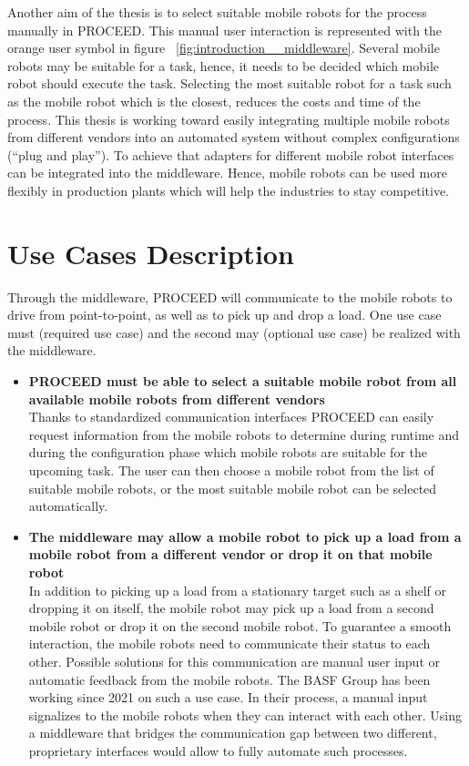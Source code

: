 \newpage
Another aim of the thesis is to select suitable mobile robots for the process manually in PROCEED. This manual user interaction is represented with the orange user symbol in figure ~\ref{fig:introduction__middleware}. Several mobile robots may be suitable for a task, hence, it needs to be decided which mobile robot should execute the task. Selecting the most suitable robot for a task such as the mobile robot which is the closest, reduces the costs and time of the process. This thesis is working toward easily integrating multiple mobile robots from different vendors into an automated system without complex configurations (“plug and play”). To achieve that adapters for different mobile robot interfaces can be integrated into the middleware. Hence, mobile robots can be used more flexibly in production plants which will help the industries to stay competitive.

\section{Use Cases Description}
Through the middleware, PROCEED will communicate to the mobile robots to drive from point-to-point, as well as to pick up and drop a load. One use case must (required use case) and the second may (optional use case) be realized with the middleware.
 \begin{itemize}
   \item \textbf{ PROCEED must be able to select a suitable mobile robot from all available mobile robots from different vendors} \hfill \\
Thanks to standardized communication interfaces PROCEED can easily request information from the mobile robots to determine during runtime and during the configuration phase which mobile robots are suitable for the upcoming task. The user can then choose a mobile robot from the list of suitable mobile robots, or the most suitable mobile robot can be selected automatically.
   \item \textbf{ The middleware may allow a mobile robot to pick up a load from a mobile robot from a different vendor or drop it on that mobile robot} \hfill \\
In addition to picking up a load from a stationary target such as a shelf or dropping it on itself, the mobile robot may pick up a load from a second mobile robot or drop it on the second mobile robot. To guarantee a smooth interaction, the mobile robots need to communicate their status to each other. Possible solutions for this communication are manual user input or automatic feedback from the mobile robots. The BASF Group has been working since 2021 on such a use case. In their process, a manual input signalizes to the mobile robots when they can interact with each other. Using a middleware that bridges the communication gap between two different, proprietary interfaces would allow to fully automate such processes.
  \end{itemize}

